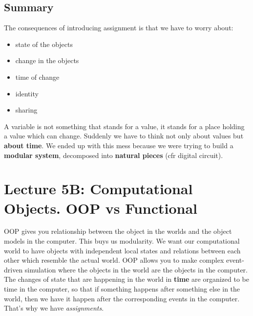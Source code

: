 \documentclass[a4paper,twoside]{article}
\numberwithin{equation}{section}
\begin{document}
\subsection{Summary}
The consequences of introducing assignment is that we have to worry about:
\begin{itemize}
    \item state of the objects
    \item change in the objects
    \item time of change
    \item identity
    \item sharing
\end{itemize}
A variable is not something that stands for a value, it stands for a place holding a value which can change.
Suddenly we have to think not only about values but \textbf{about time}.
We ended up with this mess because we were trying to build a \textbf{modular system}, decomposed into \textbf{natural
    pieces} (cfr digital circuit).

\section{Lecture 5B: Computational Objects. OOP vs Functional}
OOP gives you relationship between the object in the worlds and the object models in the computer.
This buys us modularity. We want our computational world to have objects with independent local states
and relations between each other which resemble the actual world.
OOP allows you to make complex event-driven simulation where the objects in the world are
the objects in the computer. The changes of state that are happening in the world in \textbf{time} are
organized to be time in the computer, so that if something happens after something else in the world,
then we have it happen after the corresponding events in the computer. That's why we have
\textit{assignments}.
\end{document}
